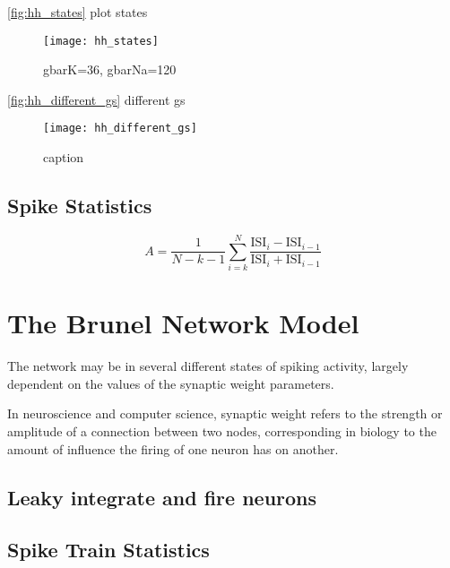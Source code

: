 \autoref{fig:hh_states} plot states

\begin{figure}[H]
    \centering
    \texttt{[image: hh\_states]}
    \caption{gbarK=36, gbarNa=120
    }
    \label{fig:hh_states}
\end{figure}

\autoref{fig:hh_different_gs} different gs

\begin{figure}[H]
    \centering
    \texttt{[image: hh\_different\_gs]}
    \caption{caption
    }
    \label{fig:hh_different_gs}
\end{figure}


\subsection{Spike Statistics}\label{sec:spike_statistics}


\begin{equation}\label{eq:accomm_index}
    A = \frac{1}{N -k - 1} \sum_{i=k}^N \frac{\mathrm{ISI}_i - \mathrm{ISI}_{i-1}}{\mathrm{ISI}_i + \mathrm{ISI}_{i-1}}
\end{equation}

\section{The Brunel Network Model}

The network may be in several different states of spiking activity, largely dependent on the values of the synaptic weight parameters.

In neuroscience and computer science, synaptic weight refers to the strength or amplitude of a connection between two nodes, corresponding in biology to the amount of influence the firing of one neuron has on another.

\subsection{Leaky integrate and fire neurons}

\subsection{Spike Train Statistics}

